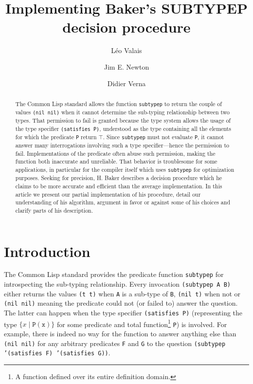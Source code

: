 \documentclass[format=sigconf]{acmart}
\title{Implementing Baker's SUBTYPEP decision procedure}
\author{Léo Valais}
\author{Jim E. Newton}
\author{Didier Verna}
\affiliation{%
  \institution{EPITA/LRDE}
  \streetaddress{14-16 rue Voltaire}
  \postcode{94270}
  \city{Le Kremlin-Bic{\^e}tre}
  \country{France}
}
\newcommand\code[2][\small]{\sloppy\texttt{#1#2}}
\theoremstyle{definition}
\begin{document}
\begin{abstract}
  The Common Lisp standard allows the function \code{subtypep} to return
  the couple of values \code{(nil nil)} when it cannot determine the
  sub-typing relationship between two types. That permission to fail
  is granted because the type system allows the usage of the type specifier
  \code{(satisfies P)}, understood as the type containing all the
  elements for which the predicate \code{P} return $\top$. Since \code{subtypep}
  must not evaluate \code{P}, it cannot answer many interrogations involving
  such a type specifier---hence the permission to fail. Implementations of the
  predicate often abuse such permission, making the function both inaccurate and
  unreliable. That behavior is troublesome for some applications, in particular
  for the compiler itself which uses \code{subtypep} for optimization purposes.
  Seeking for precision, H. Baker describes a decision procedure which he claims
  to be more accurate and efficient than the average implementation.
  In this article we present our partial implementation of his procedure, detail
  our understanding of his algorithm, argument in favor or against some of
  his choices and clarify parts of his description.
\end{abstract}

\maketitle

\section{Introduction}
The Common Lisp standard \cite{bib:ansi.94.cl} provides the predicate function
\code{subtypep} for
introspecting the sub-typing relationship. Every invocation \code{(subtypep A B)}
either returns the values \code{(t t)} when \code{A} is a sub-type of \code{B},
\code{(nil t)} when not or \code{(nil nil)} meaning the predicate could not
(or failed to) answer the question. The latter can happen when the type
specifier \code{(satisfies P)} (representing the type $\{x \mid
\mathtt{P(x)}\}$ for some predicate and total function\footnote{A function
  defined over its entire definition domain.} \code{P}) is involved. For example,
there is indeed no way for the function to answer anything else than \code{(nil
  nil)} for any arbitrary predicates \code{F} and \code{G} to the question
\code{(subtypep '(satisfies F) '(satisfies G))}.
\end{document}
